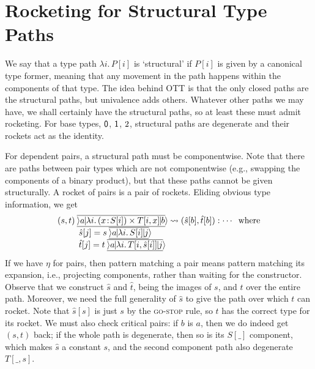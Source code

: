 \documentclass{sigplanconf}
\newcommand{\hb}{\!:\!}
\begin{document}
\section{Rocketing for Structural Type Paths}

We say that a type path $\lambda i.\,P[i]$ is `structural' if $P[i]$
is given by a canonical type former, meaning that any movement in the
path happens within the components of that type.  The idea behind OTT
is that the only closed paths are the structural paths, but univalence
adds others. Whatever other paths we may have, we shall certainly have
the structural paths, so at least these must admit rocketing. For base
types, $\mathsf{0}$, $\mathsf{1}$, $2$, structural paths are degenerate and
their rockets act as the identity.

For dependent pairs, a structural path must be componentwise. Note
that there are paths between pair types which are not componentwise
(e.g., swapping the components of a binary product), but that these
paths cannot be given structurally. A rocket of pairs is a pair of
rockets. Eliding obvious type information, we get
\[\begin{array}{l}
\xp {(s,t)} a{\lambda i.\,(x\hb S[i])\times T[i,x]}b \leadsto
  (\hat s[b], \hat t[b]):\cdots\;\;\textrm{where} \\
\qquad\begin{array}{l}
  \hat s[j]= \xp s a {\lambda i.\,S[i]} j \\
  \hat t[j]= \xp t a {\lambda i.\,T[i,\hat s[i]]} j \\
\end{array}
\end{array}\]
If we have $\eta$ for pairs, then pattern matching a pair
means pattern matching its expansion, i.e., projecting components,
rather than waiting for the constructor.
Observe that we construct $\hat s$ and $\hat t$, being the images of $s$,
and $t$ over the entire path. Moreover, we need the full generality of
$\hat s$ to give the path over which $t$ can rocket. Note that $\hat
s[s]$ is just $s$ by the \textsc{go-stop} rule, so $t$ has the
correct type for its rocket. We must also check critical pairs: if
$b$ is $a$, then we do indeed get $(s,t)$ back; if the whole path is
degenerate, then so is its $S[\_]$ component, which makes $\hat s$ a
constant $s$, and the second component path also degenerate $T[\_,s]$.
\end{document}
